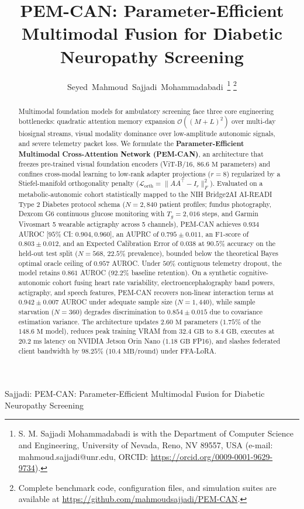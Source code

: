 \documentclass[journal,10pt,twocolumn]{IEEEtran}
\begin{document}
\title{PEM-CAN: Parameter-Efficient Multimodal Fusion for Diabetic Neuropathy Screening}

\author{Seyed~Mahmoud~Sajjadi~Mohammadabadi\,%
\thanks{S. M. Sajjadi Mohammadabadi is with the Department of Computer Science and Engineering, University of Nevada, Reno, NV 89557, USA (e-mail: mahmoud.sajjadi@unr.edu, ORCID: \url{https://orcid.org/0009-0001-9629-9734}).}%
\thanks{Complete benchmark code, configuration files, and simulation suites are available at \url{https://github.com/mahmoudsajjadi/PEM-CAN}.}}

%
{Sajjadi: PEM-CAN: Parameter-Efficient Multimodal Fusion for Diabetic Neuropathy Screening}

\maketitle

\begin{abstract}
Multimodal foundation models for ambulatory screening face three core engineering bottlenecks: quadratic attention memory expansion $\mathcal{O}((M+L)^2)$ over multi-day biosignal streams, visual modality dominance over low-amplitude autonomic signals, and severe telemetry packet loss. We formulate the \textbf{Parameter-Efficient Multimodal Cross-Attention Network (PEM-CAN)}, an architecture that freezes pre-trained visual foundation encoders (ViT-B/16, $86.6\text{ M}$ parameters) and confines cross-modal learning to low-rank adapter projections ($r=8$) regularized by a Stiefel-manifold orthogonality penalty ($\mathcal{L}_{\text{orth}} = \|AA^\top - I_r\|_F^2$). Evaluated on a metabolic-autonomic cohort statistically mapped to the NIH Bridge2AI AI-READI Type 2 Diabetes protocol schema ($N=2{,}840$ patient profiles; fundus photography, Dexcom G6 continuous glucose monitoring with $T_g=2{,}016$ steps, and Garmin Vivosmart 5 wearable actigraphy across 5 channels), PEM-CAN achieves $0.934$ AUROC [$95\%$ CI: $0.904, 0.960$], an AUPRC of $0.795 \pm 0.011$, an F1-score of $0.803 \pm 0.012$, and an Expected Calibration Error of $0.038$ at $90.5\%$ accuracy on the held-out test split ($N=568$, $22.5\%$ prevalence), bounded below the theoretical Bayes optimal oracle ceiling of $0.957$ AUROC. Under $50\%$ contiguous telemetry dropout, the model retains $0.861$ AUROC ($92.2\%$ baseline retention). On a synthetic cognitive-autonomic cohort fusing heart rate variability, electroencephalography band powers, actigraphy, and speech features, PEM-CAN recovers non-linear interaction terms at $0.942 \pm 0.007$ AUROC under adequate sample size ($N=1{,}440$), while sample starvation ($N=360$) degrades discrimination to $0.854 \pm 0.015$ due to covariance estimation variance. The architecture updates $2.60\text{ M}$ parameters ($1.75\%$ of the $148.6\text{ M}$ model), reduces peak training VRAM from $32.4\text{ GB}$ to $8.4\text{ GB}$, executes at $20.2\text{ ms}$ latency on NVIDIA Jetson Orin Nano ($1.18\text{ GB}$ FP16), and slashes federated client bandwidth by $98.25\%$ ($10.4\text{ MB/round}$) under FFA-LoRA.
\end{abstract}
\end{document}

